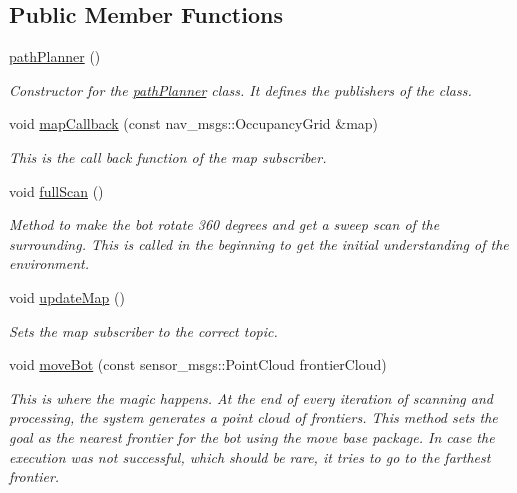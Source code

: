 \subsection*{Public Member Functions}
\begin{DoxyCompactItemize}
\item 
\hyperlink{classpathPlanner_aff1bbc2236712fb764100cebe851c3ed}{path\+Planner} ()\hypertarget{classpathPlanner_aff1bbc2236712fb764100cebe851c3ed}{}\label{classpathPlanner_aff1bbc2236712fb764100cebe851c3ed}

\begin{DoxyCompactList}\small\item\em Constructor for the \hyperlink{classpathPlanner}{path\+Planner} class. It defines the publishers of the class. \end{DoxyCompactList}\item 
void \hyperlink{classpathPlanner_a13cd0ca87b3c6f8b4ade900df966e737}{map\+Callback} (const nav\+\_\+msgs\+::\+Occupancy\+Grid \&map)
\begin{DoxyCompactList}\small\item\em This is the call back function of the map subscriber. \end{DoxyCompactList}\item 
void \hyperlink{classpathPlanner_acbe410097020c8f6073a9a19ef8fc68e}{full\+Scan} ()
\begin{DoxyCompactList}\small\item\em Method to make the bot rotate 360 degrees and get a sweep scan of the surrounding. This is called in the beginning to get the initial understanding of the environment. \end{DoxyCompactList}\item 
void \hyperlink{classpathPlanner_a2455be4e0454389304f9835b5e8ccfae}{update\+Map} ()
\begin{DoxyCompactList}\small\item\em Sets the map subscriber to the correct topic. \end{DoxyCompactList}\item 
void \hyperlink{classpathPlanner_a442f9f0d8c9e38ac3e1962a005d2e18a}{move\+Bot} (const sensor\+\_\+msgs\+::\+Point\+Cloud frontier\+Cloud)
\begin{DoxyCompactList}\small\item\em This is where the magic happens. At the end of every iteration of scanning and processing, the system generates a point cloud of frontiers. This method sets the goal as the nearest frontier for the bot using the move base package. In case the execution was not successful, which should be rare, it tries to go to the farthest frontier. \end{DoxyCompactList}\item 

\end{DoxyCompactItemize}
